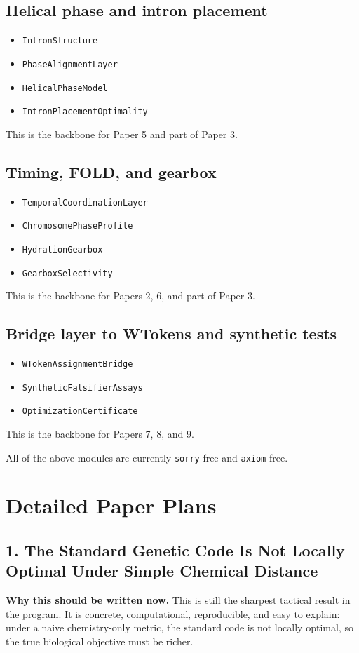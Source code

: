 \documentclass[11pt]{article}
\begin{document}
\subsection*{Helical phase and intron placement}
\begin{itemize}
\item \texttt{IntronStructure}
\item \texttt{PhaseAlignmentLayer}
\item \texttt{HelicalPhaseModel}
\item \texttt{IntronPlacementOptimality}
\end{itemize}
This is the backbone for Paper 5 and part of Paper 3.

\subsection*{Timing, FOLD, and gearbox}
\begin{itemize}
\item \texttt{TemporalCoordinationLayer}
\item \texttt{ChromosomePhaseProfile}
\item \texttt{HydrationGearbox}
\item \texttt{GearboxSelectivity}
\end{itemize}
This is the backbone for Papers 2, 6, and part of Paper 3.

\subsection*{Bridge layer to WTokens and synthetic tests}
\begin{itemize}
\item \texttt{WTokenAssignmentBridge}
\item \texttt{SyntheticFalsifierAssays}
\item \texttt{OptimizationCertificate}
\end{itemize}
This is the backbone for Papers 7, 8, and 9.

All of the above modules are currently \texttt{sorry}-free and \texttt{axiom}-free.

\section*{Detailed Paper Plans}

\subsection*{1. The Standard Genetic Code Is Not Locally Optimal Under Simple Chemical Distance}
\textbf{Why this should be written now.} This is still the sharpest tactical result in the program. It is concrete, computational, reproducible, and easy to explain: under a naive chemistry-only metric, the standard code is not locally optimal, so the true biological objective must be richer.
\end{document}
